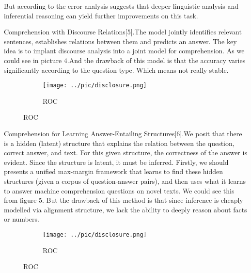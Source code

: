 \documentclass[runningheads,a4paper]{llncs}
\begin{document}
But according to the error analysis suggests that deeper linguistic analysis and inferential reasoning can yield further improvements on this task.


Comprehension with Discourse Relations[5].The model jointly identifies relevant sentences, establishes relations between them and predicts an answer. The key idea is to implant discourse analysis into a joint model for comprehension. As we could see in picture 4.And the drawback of this model is that the accuracy varies significantly according to the question type. Which means not really stable. 
\begin{figure}[p]
	\centering
	\begin{subfigure}{.5\textwidth}
		\centering
		\texttt{[image: ../pic/disclosure.png]}
		\caption{ROC}
		\label{figure 4:disclosure method}
	\end{subfigure}
	
\end{figure}

Comprehension for Learning Answer-Entailing Structures[6].We posit that there is a hidden (latent) structure that explains the relation between the question, correct answer, and text. For this given structure, the correctness of the answer is evident. Since the structure is latent, it must be inferred. Firstly, we should presents a unified max-margin framework that learns to find these hidden structures (given a corpus of question-answer pairs), and then uses what it learns to answer machine comprehension questions on novel texts. We could see this from figure 5. But the drawback of this method is that since inference is cheaply modelled via alignment structure, we lack the ability to deeply reason about facts or numbers. 
\begin{figure}[p]
	\centering
	\begin{subfigure}{.5\textwidth}
		\centering
		\texttt{[image: ../pic/disclosure.png]}
		\caption{ROC}
		\label{figure 5:answer entailing method}
	\end{subfigure}
	
\end{figure}
\end{document}
